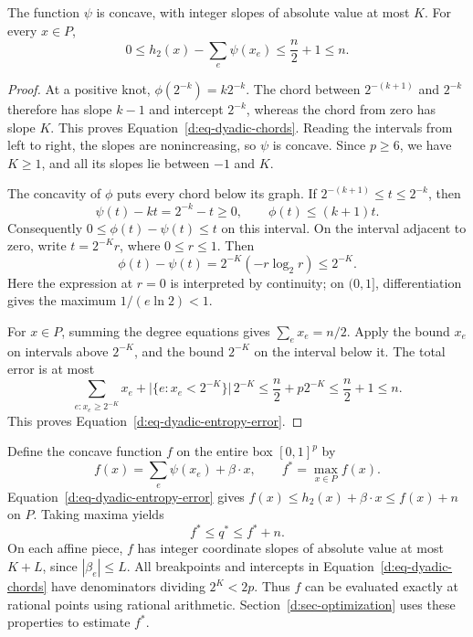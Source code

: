 \begin{lemma}
\label{d:lem-dyadic-entropy}
The function \(\psi\) is concave, with integer slopes of absolute value
at most \(K\).  For every \(x\in P\),
\begin{equation}
\label{d:eq-dyadic-entropy-error}
  0\le h_2(x)-\sum_e\psi(x_e)
     \le\frac n2+1\le n.
\end{equation}
\end{lemma}

\begin{proof}
At a positive knot, \(\phi(2^{-k})=k2^{-k}\).  The chord between
\(2^{-(k+1)}\) and \(2^{-k}\) therefore has slope \(k-1\) and
intercept \(2^{-k}\), whereas the chord from zero has slope \(K\).
This proves Equation~\eqref{d:eq-dyadic-chords}.  Reading the intervals
from left to right, the slopes are nonincreasing, so \(\psi\) is
concave.  Since \(p\ge6\), we have \(K\ge1\), and all its slopes lie
between \(-1\) and \(K\).

The concavity of \(\phi\) puts every chord below its graph.  If
\(2^{-(k+1)}\le t\le2^{-k}\), then
\[
  \psi(t)-kt=2^{-k}-t\ge0,
  \qquad \phi(t)\le(k+1)t.
\]
Consequently \(0\le\phi(t)-\psi(t)\le t\) on this interval.
On the interval adjacent to zero, write \(t=2^{-K}r\), where
\(0\le r\le1\).  Then
\[
  \phi(t)-\psi(t)=2^{-K}(-r\log_2 r)\le2^{-K}.
\]
Here the expression at \(r=0\) is interpreted by continuity; on
\((0,1]\), differentiation gives the maximum
\(1/(e\ln2)<1\).

For \(x\in P\), summing the degree equations gives
\(\sum_e x_e=n/2\).  Apply the bound \(x_e\) on intervals above
\(2^{-K}\), and the bound \(2^{-K}\) on the interval below it.
The total error is at most
\[
  \sum_{e:x_e\ge2^{-K}}x_e
     +\bigl|\{e:x_e<2^{-K}\}\bigr|\,2^{-K}
  \le \frac n2+p2^{-K}
  \le \frac n2+1
  \le n.
\]
This proves Equation~\eqref{d:eq-dyadic-entropy-error}.
\end{proof}

Define the concave function \(f\) on the entire box \([0,1]^p\) by
\begin{equation}
\label{d:eq-surrogate-objective}
  f(x)=\sum_e\psi(x_e)+\beta\cdot x,\qquad
  f^*=\max_{x\in P}f(x).
\end{equation}
Equation~\eqref{d:eq-dyadic-entropy-error} gives
\(f(x)\le h_2(x)+\beta\cdot x\le f(x)+n\) on \(P\).
Taking maxima yields
\begin{equation}
\label{d:eq-surrogate-gap}
  f^*\le q^*\le f^*+n.
\end{equation}
On each affine piece, \(f\) has integer coordinate slopes of absolute
value at most \(K+L\), since \(|\beta_e|\le L\).  All breakpoints and
intercepts in Equation~\eqref{d:eq-dyadic-chords} have denominators
dividing \(2^K<2p\).  Thus \(f\) can be evaluated exactly at rational
points using rational arithmetic.  Section~\ref{d:sec-optimization}
uses these properties to estimate \(f^*\).
